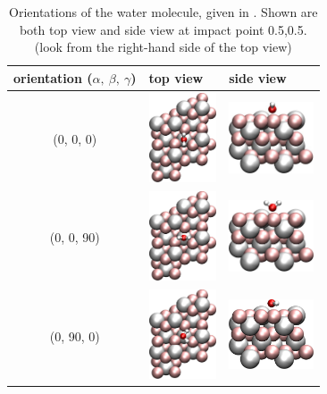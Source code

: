 \documentclass[11pt,DIV=13,BCOR=5mm,a4paper,headinclude]{scrbook}
\begin{document}
 \begin{table}[!h]
 \centering
  \caption{Orientations of the water molecule, given in \textdegree.
Shown are both top view and side view at impact point 0.5,0.5.
(look from the right-hand side of the top view)}
 \begin{tabular}{cp{4cm}p{4cm}}
 \toprule
 orientation ($\alpha,~\beta,~\gamma$)& top view & side view \\\midrule
 (0, 0, 0)  & \includegraphics[width=2cm,angle=90]{figures/0001/Ausrichtungsbilder/0_0_0-toptest.png}
&\includegraphics[width=2.5cm]{figures/0001/Ausrichtungsbilder/0_0_0-sidetest.png}\\
(0, 0, 90)   & \includegraphics[width=2cm,angle=90]{figures/0001/Ausrichtungsbilder/0_0_90-toptest.png}
& \includegraphics[width=2.5cm]{figures/0001/Ausrichtungsbilder/0_0_90-sidetest.png}\\
(0, 90, 0)   & \includegraphics[width=2cm,angle=90]{figures/0001/Ausrichtungsbilder/0_90_0-toptest.png}
& \includegraphics[width=2.5cm]{figures/0001/Ausrichtungsbilder/0_90_0-sidetest.png}\\

\end{tabular}
\end{table}
\end{document}
